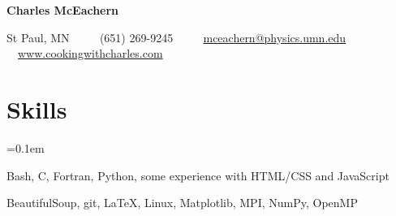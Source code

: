\documentclass[11pt,letterpaper]{article}
\newcommand{\ResumeSection}[1]{
  \section*{ {\color{MidnightBlue}#1 \sout{\hfill} } } }
\newcommand{\URL}[1]{\href{#1}{#1}\xspace}
\newcommand{\CPP}{
  C\nolinebreak[4]\hspace{-.05em}\raisebox{.22ex}{\footnotesize\bf ++}\xspace}
\begin{document}


\begin{center}
  { \Huge \textbf{Charles McEachern} }

  \vspace{7px}

  St Paul, MN
  \ \ \textbullet
  \ \ (651) 269-9245
  \ \ \textbullet
  \ \ \href{mailto:mceachern@physics.umn.edu}{mceachern@physics.umn.edu}
  \ \ \textbullet
  \ \ \URL{www.cookingwithcharles.com}

  \vspace{3px}

\end{center}


\ResumeSection{Skills}

\begin{description}[leftmargin=!, labelindent=\parindent, 
                    labelwidth=\widthof{\bfseries Languages}]
  \parskip=0.1em

  \item[Languages]
    Bash, \CPP, Fortran, Python, some experience with HTML/CSS and JavaScript

  \item[Tools]
    BeautifulSoup, git, \LaTeX, Linux, Matplotlib, MPI, NumPy, OpenMP

\end{description}

\end{document}
